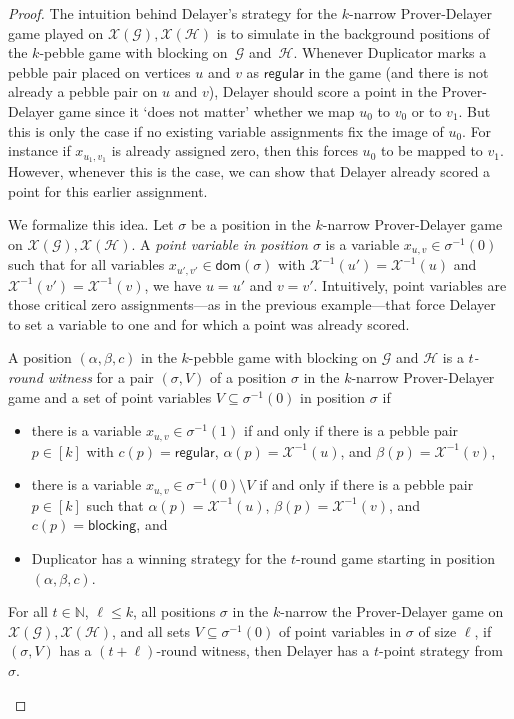 \documentclass[a4paper,english, thm-restate]{lipics-v2021}
\newcommand{\defining}[1]{\emph{#1}}
\newcommand{\regular}{\mathsf{regular}}
\newcommand{\blocking}{\mathsf{blocking}}
\newcommand{\inv}[1]{#1^{-1}}
\newcommand{\graphG}{\mathcal{G}}
\newcommand{\graphH}{\mathcal{H}}
\newcommand{\dom}{\mathsf{dom}}
\newcommand{\graphXG}{\mathcal{X}(\mathcal{G})}
\newcommand{\graphXH}{\mathcal{X}(\mathcal{H})}
\newcommand{\X}{\mathcal{X}}
\newcommand{\XI}{\X^{-1}}
\begin{document}
%
\begin{proof}
The intuition behind Delayer's strategy for the $k$-narrow Prover-Delayer game played on $\graphXG,\graphXH$ is to 
simulate in the background positions of the $k$-pebble game with blocking on~$\graphG$ and~$\graphH$.
Whenever Duplicator marks a pebble pair placed on vertices $u$ and $v$ as $\regular$ in the game
(and there is not already a pebble pair on $u$ and $v$),
Delayer should score a point in the Prover-Delayer game since it `does not matter' whether we map $u_0$ to $v_0$ or to $v_1$.
But this is only the case if no existing variable assignments fix the image of $u_0$. For instance if $x_{u_1,v_1}$ is already assigned zero, then this forces $u_0$ to be mapped to $v_1$. However, whenever this is the case, we can show that Delayer already scored a point for this earlier assignment.

We formalize this idea.
Let $\sigma$ be a position in the $k$-narrow 
Prover-Delayer game on $\graphXG, \graphXH$.
A \defining{point variable in position $\sigma$} is a variable $x_{u,v} \in \inv{\sigma}(0)$ such that
for all variables $x_{u',v'} \in \dom(\sigma)$ with $\XI(u') = \XI(u)$ and $\XI(v') = \XI(v)$, we have $u=u'$ and $v=v'$.
Intuitively, point variables are those critical zero assignments---as in the previous example---that force Delayer to set a variable to one and for which a point was already scored. 

A position $(\alpha,\beta,c)$ in the $k$-pebble game with blocking on $\graphG$ and $\graphH$ is a \defining{$t$-round witness} for
a pair $(\sigma, V)$ of a position $\sigma$ in the $k$-narrow Prover-Delayer game and a set of point variables $V \subseteq \sigma^{-1}(0)$ in position $\sigma$ if
\begin{itemize}
        \item there is a variable $x_{u,v} \in \sigma^{-1}(1)$ if and only if
        there is a pebble pair $p \in [k]$ with $c(p) = \regular$, $\alpha(p) = \XI(u)$, and $\beta(p) = \XI(v)$,
        \item there is a variable  $x_{u,v} \in \sigma^{-1}(0)\setminus V$ if and only if
        there is a pebble pair $p \in [k]$ such that $\alpha(p) = \XI(u)$, $\beta(p) = \XI(v)$, and $c(p) = \blocking$, and
        \item Duplicator has a winning strategy for the $t$-round game starting in position $(\alpha, \beta,c)$. 
\end{itemize}

\begin{claim} \label{claim: witness_implies_points} For all $t \in \mathbb{N}$, $\ell \leq k$, all positions $\sigma$ in the $k$-narrow the Prover-Delayer
game on $\graphXG, \graphXH$, and all sets $V\subseteq \inv{\sigma}(0)$ of point variables in $\sigma$ of size $\ell$,
 if $(\sigma, V)$ has a $(t+\ell)$-round witness, 
then
Delayer has a $t$-point strategy from $\sigma$.
\end{claim}


\end{proof}
\end{document}
